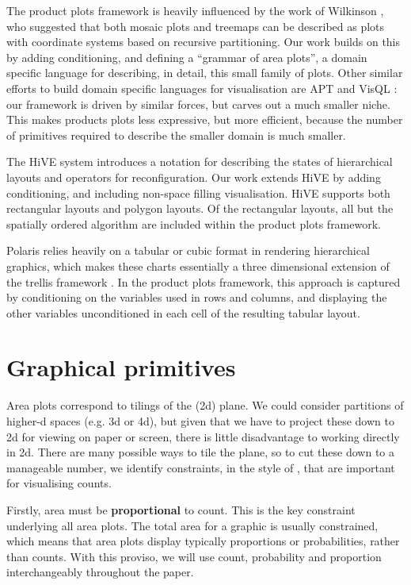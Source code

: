 \documentclass[journal]{vgtc}
\begin{document}
The product plots framework is heavily influenced by the work of Wilkinson \citep{wilkinson:1999, wilkinson:2005}, who suggested that both mosaic plots and treemaps can be described as plots with coordinate systems based on recursive partitioning. Our work builds on this by adding conditioning, and defining a ``grammar of area plots'', a domain specific language for describing, in detail, this small family of plots. Other similar efforts to build domain specific languages for visualisation are APT \citep{mackinlay:1986} and VisQL \citep{mackinlay:2007}: our framework is driven by similar forces, but carves out a much smaller niche. This makes products plots less expressive, but more efficient, because the number of primitives required to describe the smaller domain is much smaller.

The HiVE system \citep{slingsby:2009} introduces a notation for describing the states of hierarchical layouts and operators for reconfiguration. Our work extends HiVE by adding conditioning, and including non-space filling visualisation. HiVE supports both rectangular layouts and polygon layouts. Of the rectangular layouts, all but the spatially ordered algorithm are included within the product plots framework.

Polaris \cite{stolte:2002} relies heavily on a tabular or cubic format in rendering hierarchical graphics, which makes these charts essentially a three dimensional extension of the trellis framework \citep{cleveland:1994,becker:1996}. In the product plots framework, this approach is captured by conditioning on the variables used in rows and columns, and displaying the other variables unconditioned in each cell of the resulting tabular layout.

\section{Graphical primitives}
\label{sec:primitives}

Area plots correspond to tilings of the (2d) plane. We could consider partitions of higher-d spaces (e.g. 3d or 4d), but given that we have to project these down to 2d for viewing on paper or screen, there is little disadvantage to working directly in 2d. There are many possible ways to tile the plane, so to cut these down to a manageable number, we identify  constraints, in the style of \citep{keim:2002}, that are important for visualising counts.

Firstly, area must be {\bf proportional} to count. This is the key constraint underlying all area plots. The total area for a graphic is usually constrained, which means that area plots display typically proportions or probabilities, rather than counts. With this proviso, we will use count, probability and proportion interchangeably throughout the paper.
\end{document}
